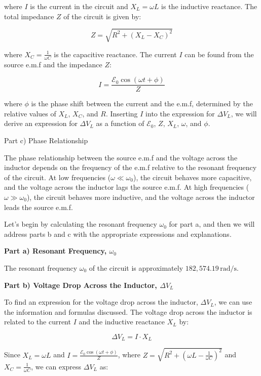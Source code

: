 where \(I\) is the current in the circuit and \(X_{L} = \omega L\) is the inductive reactance. The total impedance \(Z\) of the circuit is given by:

\[ Z = \sqrt{R^2 + (X_{L} - X_{C})^2} \]

where \(X_{C} = \frac{1}{\omega C}\) is the capacitive reactance. The current \(I\) can be found from the source e.m.f and the impedance \(Z\):

\[ I = \frac{\mathcal{E}_{0} \cos(\omega t + \phi)}{Z} \]

where \(\phi\) is the phase shift between the current and the e.m.f, determined by the relative values of \(X_{L}\), \(X_{C}\), and \(R\). Inserting \(I\) into the expression for \(\Delta V_{L}\), we will derive an expression for \(\Delta V_{L}\) as a function of \(\mathcal{E}_{0}\), \(Z\), \(X_{L}\), \(\omega\), and \(\phi\).

Part c) Phase Relationship

The phase relationship between the source e.m.f and the voltage across the inductor depends on the frequency of the e.m.f relative to the resonant frequency of the circuit. At low frequencies (\(\omega \ll \omega_{0}\)), the circuit behaves more capacitive, and the voltage across the inductor lags the source e.m.f. At high frequencies (\(\omega \gg \omega_{0}\)), the circuit behaves more inductive, and the voltage across the inductor leads the source e.m.f.

Let's begin by calculating the resonant frequency \(\omega_{0}\) for part a, and then we will address parts b and c with the appropriate expressions and explanations.

\textbf{Part a) Resonant Frequency, \( \omega_{0} \)}

The resonant frequency \(\omega_{0}\) of the circuit is approximately \(182,574.19 \, \text{rad/s}\).

\textbf{Part b) Voltage Drop Across the Inductor, \( \Delta V_{L} \)}

To find an expression for the voltage drop across the inductor, \( \Delta V_{L} \), we can use the information and formulas discussed. The voltage drop across the inductor is related to the current \(I\) and the inductive reactance \(X_{L}\) by:

\[ \Delta V_{L} = I \cdot X_{L} \]

Since \(X_{L} = \omega L\) and \(I = \frac{\mathcal{E}_{0} \cos(\omega t + \phi)}{Z}\), where \(Z = \sqrt{R^2 + (\omega L - \frac{1}{\omega C})^2}\) and \(X_{C} = \frac{1}{\omega C}\), we can express \( \Delta V_{L} \) as:

